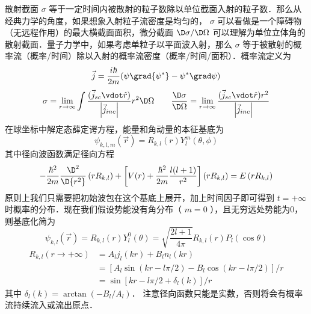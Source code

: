 
散射截面 $\sigma$ 等于一定时间内被散射的粒子数除以单位截面入射的粒子数．那么从经典力学的角度，如果想象入射粒子流密度是均匀的， $\sigma$ 可以看做是一个障碍物（无远程作用）的最大横截面面积，微分截面 $\D \sigma/\D\Omega$ 可以理解为单位立体角的散射截面．量子力学中，如果考虑单粒子以平面波入射，那么 $\sigma$ 等于被散射的概率流（概率/时间）除以入射的概率流密度（概率/时间/面积）．概率流定义为
\begin{equation}
\vec j = \frac{{i\hbar }}{{2m}}(\psi \grad {\psi ^ * } - {\psi ^ * }\grad \psi )
\end{equation}
\begin{equation}\label{ParWav_eq3}
\sigma  = \lim_{r \to \infty } \int {\frac{{{\text{(}}{{\vec j}_{sc}} \vdot \hat r{\text{)}}}}{{\left| {{{\vec j}_{inc}}} \right|}}{r^2}\D \Omega } 
\qquad
\frac{{\D \sigma }}{{\D \Omega }} = \lim_{r \to \infty } \frac{{{\text{(}}{{\vec j}_{sc}} \vdot \hat r{\text{)}}{r^2}}}{{\left| {{{\vec j}_{inc}}} \right|}}
\end{equation}
在球坐标中解定态薛定谔方程，能量和角动量的本征基底为
\begin{equation}
{\psi _{k,l,m}}(\vec r) = {R_{k,l}}(r)Y_l^m(\theta ,\phi )
\end{equation}
其中径向波函数满足径向方程
\begin{equation}\label{ParWav_eq4}
- \frac{{{\hbar ^2}}}{{2m}}\frac{{{\D ^2}}}{{\D {r^2}}}\left( {r{R_{k,l}}} \right) + \left[ {V(r) + \frac{{{\hbar ^2}}}{{2m}}\frac{{l(l + 1)}}{{{r^2}}}} \right]\left( {r{R_{k,l}}} \right) = E\left( {r{R_{k,l}}} \right)
\end{equation}
原则上我们只需要把初始波包在这个基底上展开，加上时间因子即可得到 $t =  + \infty$ 时概率的分布．现在我们假设势能没有角分布（ $m = 0$ ），且无穷远处势能为0，则基底化简为
\begin{equation}
{\psi _{k,l}}(\vec r) = {R_{k,l}}(r)Y_l^0(\theta ) = \sqrt {\frac{{2l + 1}}{{4\pi }}} {R_{k,l}}(r){P_l}(\cos \theta )
\end{equation}
\begin{equation}\begin{aligned}\label{ParWav_eq6}
{R_{k,l}}(r \to  + \infty ) &= {A_l}{j_l}(kr) + {B_l}{n_l}(kr) \\
&= [{A_l}\sin (kr - l\pi /2) - {B_l}\cos(kr - l\pi /2)]/r \\
&= \sin [kr - l\pi /2 + {\delta _l}(k)]/r
\end{aligned}\end{equation}
其中 ${\delta _l}(k) = \arctan ( { - {B_l}/{A_l}} )$． 注意径向函数只能是实数，否则将会有概率流持续流入或流出原点．

